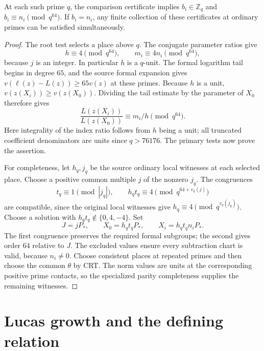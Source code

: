 \begin{lemma}\label{lem:sp-comparison}
At each such prime $q$, the comparison certificate implies
$b_i\in\mathbb Z_q$ and $b_i\equiv n_i\pmod{q^{64}}$.
If $b_i=n_i$, any finite collection of these certificates at ordinary
primes can be satisfied simultaneously.
\end{lemma}
\begin{proof}
The root test selects a place above $q$. The conjugate parameter ratios
give
\[
 h\equiv4\pmod{q^{64}},\qquad
 m_i\equiv4n_i\pmod{q^{64}},
\]
because $j$ is an integer. In particular $h$ is a $q$-unit.
The formal logarithm tail begins in degree $65$, and the source formal
expansion gives $v(\ell(z)-L(z))\ge65v(z)$ at these primes.
Because $h$ is a unit, $v(z(X_i))\ge v(z(X_0))$. Dividing the
tail estimate by the parameter of $X_0$ therefore gives
\[
 \frac{L(z(X_i))}{L(z(X_0))}
       \equiv m_i/h\pmod{q^{64}}.
\]
Here integrality of the index ratio follows from $h$ being a unit;
all truncated coefficient denominators are units since $q>76176$. The primary
tests now prove the assertion.

For completeness, let $h_q,j_q$ be the source ordinary local witnesses
at each selected place. Choose a positive common multiple $j$ of the
nonzero $j_q$. The congruences
\[
 t_q\equiv1\pmod{|j_q|},\qquad
 h_qt_q\equiv4\pmod{q^{64+v_q(j)}}
\]
are compatible, since the original local witnesses give
$h_q\equiv4\pmod{q^{v_q(j_q)}}$. Choose a solution with
$h_qt_q\notin\{0,4,-4\}$. Set
\[
 J=jP_*,\qquad X_0=h_qt_qP_*,\qquad X_i=h_qt_qn_iP_*.
\]
The first congruence preserves the required formal subgroups; the
second gives order $64$ relative to $J$. The excluded values ensure
every subtraction chart is valid, because $n_i\ne0$. Choose consistent
places at repeated primes and then choose the common $\theta$ by CRT.
The norm values are units at the corresponding positive prime contacts,
so the specialized parity completeness supplies the remaining witnesses.
\end{proof}

\section{Lucas growth and the defining relation}\label{sec:sp-lucas}


